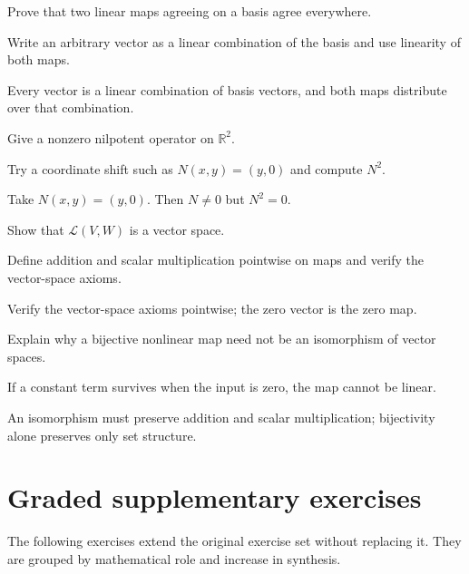 \begin{exercise}\label{exr:i05-05}
Prove that two linear maps agreeing on a basis agree everywhere.
\end{exercise}
\begin{hint}
Write an arbitrary vector as a linear combination of the basis and use linearity of both maps.
\end{hint}
\begin{solution}
Every vector is a linear combination of basis vectors, and both maps distribute over that combination.
\end{solution}

\begin{exercise}\label{exr:i05-06}
Give a nonzero nilpotent operator on $\mathbb R^2$.
\end{exercise}
\begin{hint}
Try a coordinate shift such as \(N(x,y)=(y,0)\) and compute \(N^2\).
\end{hint}
\begin{solution}
Take $N(x,y)=(y,0)$. Then $N\ne0$ but $N^2=0$.
\end{solution}

\begin{exercise}\label{exr:i05-07}
Show that $\mathcal L(V,W)$ is a vector space.
\end{exercise}
\begin{hint}
Define addition and scalar multiplication pointwise on maps and verify the vector-space axioms.
\end{hint}
\begin{solution}
Verify the vector-space axioms pointwise; the zero vector is the zero map.
\end{solution}

\begin{exercise}\label{exr:i05-08}
Explain why a bijective nonlinear map need not be an isomorphism of vector spaces.
\end{exercise}
\begin{hint}
If a constant term survives when the input is zero, the map cannot be linear.
\end{hint}
\begin{solution}
An isomorphism must preserve addition and scalar multiplication; bijectivity alone preserves only set structure.
\end{solution}


\section{Graded supplementary exercises}
The following exercises extend the original exercise set without replacing it. They are grouped by mathematical role and increase in synthesis.

